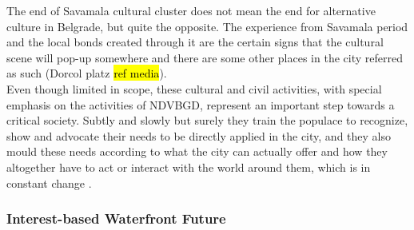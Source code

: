 \documentclass[11pt]{report}
\begin{document}
The end of Savamala cultural cluster does not mean the end for alternative culture in Belgrade, but quite the opposite. The experience from Savamala period and the local bonds created through it are the certain signs that the cultural scene will pop-up somewhere and there are some other places in the city referred as such (Dorcol platz \hl{ref media}).
\\
Even though limited in scope, these cultural and civil activities, with special emphasis on the activities of NDVBGD, represent an important step towards a critical society. Subtly and slowly but surely they train the populace to recognize, show and advocate their needs to be directly applied in the city, and they also mould these needs according to what the city can actually offer and how they altogether have to act or interact with the world around them, which is in constant change \cite{(Harvey, 2003)}. 

\subsubsection{Interest-based Waterfront Future}
\end{document}
